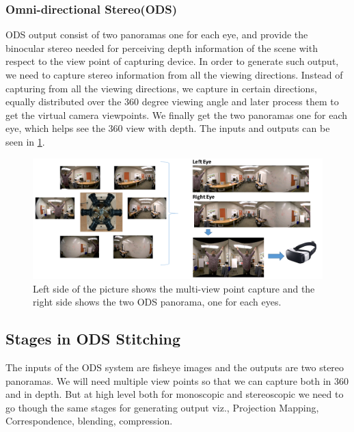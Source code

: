 \subsubsection{Omni-directional Stereo(ODS)}
ODS output consist of two panoramas one for each eye, and provide the binocular stereo needed for perceiving depth information of the scene with respect to the view point of capturing device. In order to generate such output, we need to capture stereo information from all the viewing directions. Instead of capturing from all the viewing directions, we capture in certain directions, equally distributed over the 360 degree viewing angle and later process them to get the virtual camera viewpoints. We finally get the two panoramas one for each eye, which helps see the 360 view with depth. The inputs and outputs can be seen in \ref{fig:ODS_IO}.




\begin{figure}[h]
	\begin{center}
		\includegraphics[width=1\textwidth]{data/images/ODS_IO_images.png}
	\end{center}
		\caption{Left side of the picture shows the multi-view point capture and the right side shows the two ODS panorama, one for each eyes.}	
\label{fig:ODS_IO}
\end{figure} 

\subsection{Stages in ODS Stitching}
The inputs of the ODS system are fisheye images and the outputs are two stereo panoramas. We will need multiple view points so that we can capture both in 360 and in depth. But at high level both for monoscopic and stereoscopic we need to go though the same stages for generating output viz., Projection Mapping, Correspondence, blending, compression.
